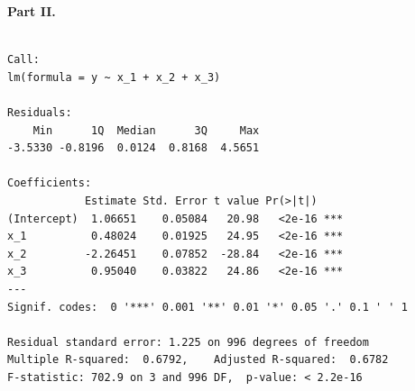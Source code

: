 \documentclass[
  letterpaper,
  DIV=11,
  numbers=noendperiod]{scrartcl}
\newenvironment{Shaded}{\begin{snugshade}}{\end{snugshade}}
\newcommand{\AttributeTok}[1]{\textcolor[rgb]{0.40,0.45,0.13}{#1}}
\newcommand{\CommentTok}[1]{\textcolor[rgb]{0.37,0.37,0.37}{#1}}
\newcommand{\DecValTok}[1]{\textcolor[rgb]{0.68,0.00,0.00}{#1}}
\newcommand{\FloatTok}[1]{\textcolor[rgb]{0.68,0.00,0.00}{#1}}
\newcommand{\FunctionTok}[1]{\textcolor[rgb]{0.28,0.35,0.67}{#1}}
\newcommand{\NormalTok}[1]{\textcolor[rgb]{0.00,0.23,0.31}{#1}}
\newcommand{\OtherTok}[1]{\textcolor[rgb]{0.00,0.23,0.31}{#1}}
\newcommand{\SpecialCharTok}[1]{\textcolor[rgb]{0.37,0.37,0.37}{#1}}
\begin{document}
\textbf{Part II.}

\begin{Shaded}
\end{Shaded}

\begin{verbatim}

Call:
lm(formula = y ~ x_1 + x_2 + x_3)

Residuals:
    Min      1Q  Median      3Q     Max 
-3.5330 -0.8196  0.0124  0.8168  4.5651 

Coefficients:
            Estimate Std. Error t value Pr(>|t|)    
(Intercept)  1.06651    0.05084   20.98   <2e-16 ***
x_1          0.48024    0.01925   24.95   <2e-16 ***
x_2         -2.26451    0.07852  -28.84   <2e-16 ***
x_3          0.95040    0.03822   24.86   <2e-16 ***
---
Signif. codes:  0 '***' 0.001 '**' 0.01 '*' 0.05 '.' 0.1 ' ' 1

Residual standard error: 1.225 on 996 degrees of freedom
Multiple R-squared:  0.6792,    Adjusted R-squared:  0.6782 
F-statistic: 702.9 on 3 and 996 DF,  p-value: < 2.2e-16
\end{verbatim}
\end{document}
